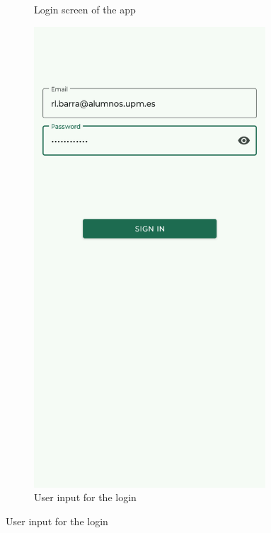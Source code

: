 \begin{enumerate}
\begin{figure}[H]
\begin{subfigure}[t]{0.3\textwidth}
                \caption{Login screen of the app}
            \end{subfigure}
            \begin{subfigure}[t]{0.281\textwidth}
                \centering
                \includegraphics[width=0.95\textwidth]{images/8/02.png}
                \caption{User input for the login}
            \end{subfigure}

\end{figure}
\end{enumerate}
